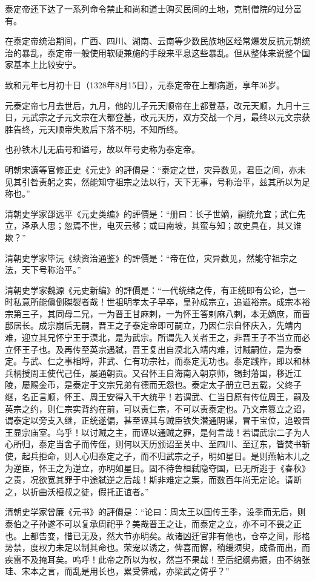 泰定帝还下达了一系列命令禁止和尚和道士购买民间的土地，克制僧院的过分富有。

在泰定帝统治期间，广西、四川、湖南、云南等少数民族地区经常爆发反抗元朝统治的暴乱，泰定帝一般使用软硬兼施的手段来平息这些暴乱。但从整体来说整个国家基本上比较安宁。

致和元年七月初十日（1328年8月15日），元泰定帝在上都病逝，享年36岁。

元泰定帝七月去世后，九月，他的儿子元天顺帝在上都登基，改元天顺，九月十三日，元武宗之子元文宗在大都登基，改元天历，双方交战一个月，最终以元文宗获胜告终，元天顺帝失败后下落不明，不知所终。

也孙铁木儿无庙号和谥号，故以年号史称为泰定帝。

明朝宋濂等官修正史《元史》的評價是：“泰定之世，灾异数见，君臣之间，亦未见其引咎责躬之实，然能知守祖宗之法以行，天下无事，号称治平，兹其所以为足称也。”

清朝史学家邵远平《元史类编》的評價是：“册曰：长子世嫡，嗣统允宜；武仁先立，泽承人思；忽焉不世，电灭云移；或曰南坡，其蛮与知；故史具在，其又谁欺？”

清朝史学家毕沅《续资治通鉴》的評價是：“帝在位，灾异数见，然能守祖宗之法，天下号称治平。”

清朝史学家魏源《元史新编》的評價是：“一代统绪之传，有正统即有公论，岂一时私意所能傎倒磔裂者哉！世祖明孝太子早卒，皇孙成宗立，追谥裕宗。成宗本裕宗第三子，其同母二兄，一为晋王甘麻剌，一为怀王答剌麻八剌，本无嫡庶，而晋邸居长。成宗崩后无嗣，晋王之子泰定帝即可嗣立，乃因仁宗自怀庆入，先靖内难，迎立其兄怀宁王于漠北，是为武宗。所谓先入关者王之，非晋王子不当立而必立怀王子也。及再传至英宗遇弑，晋王复出自漠北入靖内难，讨贼嗣位，是为泰定。与武、仁之事相埒，非武、仁有功宗社，而泰定无功也。泰定践阼，即以和林兵柄授周王使代己任，屡通朝贡。又召怀王自海南入朝京师，锡封藩国，移近江陵，屡赐金币，是泰定于文宗兄弟有德而无怨也。泰定太子册立已五载，父终子继，名正言顺，怀王、周王安得入干大统乎！若谓武、仁当日原有传位周王，嗣及英宗之约，则仁宗实背约在前，可以责仁宗，不可以责泰定也。乃文宗篡立之诏，谓泰定以旁支入继，正统遂偏，甚至诬其与贼臣铁失潜通阴谋，冒干宝位，追毁晋王显宗庙室。乌乎！以讨贼之主，而诬以通贼之罪，是何言哉！若谓武宗二子为人心所归，泰定当舍子而传侄，则何以天历颁诏至关中、至四川、至辽东，皆焚书斩使，起兵拒命，则人心归泰定之子，而不归武宗之子，明如星日。是则燕帖木儿之为逆臣，怀王之为逆立，亦明如星日。固不待鲁桓弑隐夺国，已无所逃于《春秋》之责，况欲宽其罪于中途弑逆之后哉！斯非难定之案，而数百年尚无定论。请断之，以折曲沃桓叔之徒，假托正谊者。”

清朝史学家曾廉《元书》的評價是：“论曰：周太王以国传王季，设季而无后，则泰伯之子孙遂不可以复承周祀乎？美哉晋王之让，而泰定之立，亦不可不畏之正也。上都告变，惜已无及，然大节亦明矣。故诸凶迁官非有他也，仓卒之间，形格势禁，度权力未足以制其命也。荣宠以诱之，俾喜而懈，稍缓须臾，成备而出，而疾雷不及掩耳矣。呜呼！此帝之所以为权，然岂不果哉！至后纪纲弗振，由不纳张珪、宋本之言，而乱是用长也，累受佛戒，亦梁武之俦乎？”

